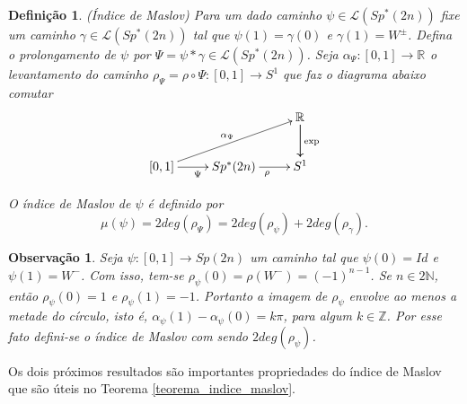 \documentclass[12pt]{book}
\newtheorem{definicao}[teorema]{Definição}
\newtheorem{observacao}[teorema]{Observação}
\newcommand{\caminhos}{\mathcal{L}}
\newcommand{\circulo}{S^{1}}
\newcommand{\gruposimpletico}[1]{Sp(#1)}
\newcommand{\gruposimpleticonaodegenerado}[1]{Sp^{#1}(2n)}
\newcommand{\inteiros}{\mathbb{Z}}
\newcommand{\intervalo}{[0,1]}
\newcommand{\real}[1]{\mathbb{R}^{#1}}
\newcommand{\reta}{\real{}}
\begin{document}
	\begin{definicao}
		(Índice de Maslov) 
		Para um dado caminho $\psi \in \caminhos(\gruposimpleticonaodegenerado{*})$ fixe um caminho $\gamma \in \caminhos(\gruposimpleticonaodegenerado{*})$ tal que $\psi(1)=\gamma(0)$ e $\gamma(1)=W^{\pm}$. Defina o prolongamento de $\psi$ por $\Psi = \psi*\gamma \in   \caminhos({\gruposimpleticonaodegenerado{*}})$. Seja $\alpha_{\Psi}: \intervalo \to \reta$ o levantamento do caminho $\rho_{\Psi} = \rho \circ \Psi:\intervalo\to \circulo$ que faz o diagrama abaixo comutar
		$$
		\xymatrix{
			& & \real{}\ar[d]\ar[d]^{\text{exp}}
			\\
			[0,1 ]\ar[urr]^{\alpha_{\Psi}} \ar[r]_{\Psi} & \gruposimpleticonaodegenerado{*} \ar[r]_{\rho} & S^{1}
		}
		$$	
		
		O índice de Maslov de $\psi$ é definido por
		$$
		\mu(\psi)= 2deg(\rho_{\Psi}) = 2deg(\rho_{\psi}) + 2deg(\rho_{\gamma}).
		$$
	\end{definicao}
	
	\begin{observacao}
		Seja $\psi:\intervalo\to \gruposimpletico{2n}$ um caminho tal que $\psi(0)=Id$ e $\psi(1)=W^{-}$. Com isso, tem-se $\rho_{\psi}(0) =\rho(W^{-}) = (-1)^{n-1}$. Se $n\in 2\mathbb{N}$, então $\rho_{\psi}(0) =1$ e $\rho_{\psi}(1)=-1$. Portanto a imagem de $\rho_{\psi}$ envolve ao menos a metade do círculo, isto é, $\alpha_{\psi}(1)-\alpha_{\psi}(0) = k\pi$, para algum $k\in \inteiros$. Por esse fato defini-se o índice de Maslov com sendo $2deg(\rho_{\psi})$.
	\end{observacao}
	
	Os dois próximos resultados são importantes propriedades do índice de Maslov que são úteis no Teorema \ref{teorema_indice_maslov}.
\end{document}
